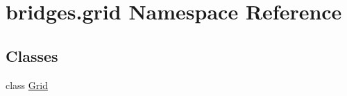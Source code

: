 \hypertarget{namespacebridges_1_1grid}{}\section{bridges.\+grid Namespace Reference}
\label{namespacebridges_1_1grid}
\subsection*{Classes}
\begin{DoxyCompactItemize}
\item 
class \mbox{\hyperlink{classbridges_1_1grid_1_1_grid}{Grid}}
\end{DoxyCompactItemize}
